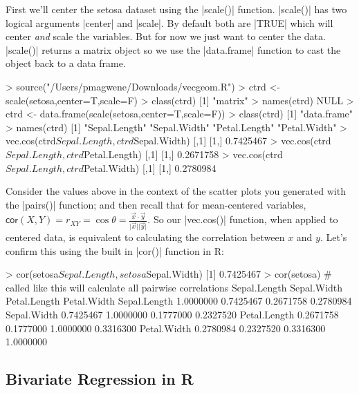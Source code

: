 First we'll center the setosa dataset using the |scale()| function. |scale()| has two logical arguments |center| and |scale|. By default both are |TRUE| which will center \emph{and} scale the variables. But for now we just want to center the data. |scale()| returns a matrix object so we use the |data.frame| function to cast the object back to a data frame.
\begin{R}
> source("/Users/pmagwene/Downloads/vecgeom.R")
> ctrd <- scale(setosa,center=T,scale=F)
> class(ctrd)
[1] "matrix"
> names(ctrd)
NULL
> ctrd <- data.frame(scale(setosa,center=T,scale=F))
> class(ctrd)
[1] "data.frame"
> names(ctrd)
[1] "Sepal.Length" "Sepal.Width"  "Petal.Length" "Petal.Width"
> vec.cos(ctrd$Sepal.Length, ctrd$Sepal.Width)
          [,1]
[1,] 0.7425467
> vec.cos(ctrd$Sepal.Length, ctrd$Petal.Length)
          [,1]
[1,] 0.2671758
> vec.cos(ctrd$Sepal.Length, ctrd$Petal.Width)
          [,1]
[1,] 0.2780984
\end{R}

Consider the values above in the context of the scatter plots you generated with the |pairs()| function; and then recall that for mean-centered variables, $\mathsf{cor}(X,Y) = r_{XY} = \cos \theta = \frac{\vec{x} \cdot \vec{y}}{\vert \vec{x}\vert \vert \vec{y} \vert}$.  So our |vec.cos()| function, when applied to centered data, is equivalent to calculating the correlation between $x$ and $y$.  Let's confirm this using the built in |cor()| function in R:
\begin{R}
> cor(setosa$Sepal.Length, setosa$Sepal.Width)
[1] 0.7425467
> cor(setosa)  # called like this will calculate all pairwise correlations
             Sepal.Length Sepal.Width Petal.Length Petal.Width
Sepal.Length    1.0000000   0.7425467    0.2671758   0.2780984
Sepal.Width     0.7425467   1.0000000    0.1777000   0.2327520
Petal.Length    0.2671758   0.1777000    1.0000000   0.3316300
Petal.Width     0.2780984   0.2327520    0.3316300   1.0000000
\end{R}


\subsection{Bivariate Regression in R}

